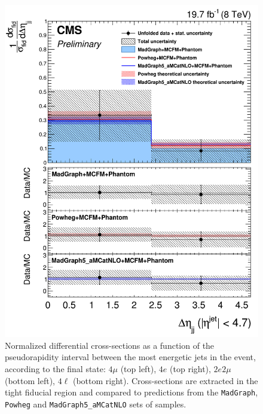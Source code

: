 \begin{figure}[hbtp]
\begin{center}
    \includegraphics[width=\cmsFigWidth]{Figures/DiffCrossSecZZTo4lDeta_Unfolded_fr_MadGraph_norm.png}       
    \caption{\footnotesize{Normalized differential cross-sections as a function of the pseudorapidity interval between the most energetic jets in the event, according to the final state: $4\mu$ (top left), $4e$ (top right), $2e2\mu$  (bottom left),  $4\ell$ (bottom right). Cross-sections are extracted in the tight fiducial region and compared to predictions from the \texttt{MadGraph}, \texttt{Powheg}  and \texttt{MadGraph5\_aMCatNLO} sets of samples.}}
    \label{fig:diff_xs_deta}
  \end{center}
\end{figure}

